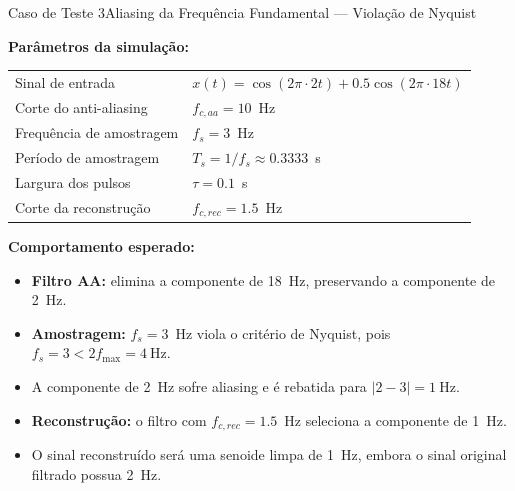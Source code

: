 \begin{frame}{Caso de Teste 3}{Aliasing da Frequência Fundamental — Violação de Nyquist}
	\small
	
	\textbf{Parâmetros da simulação:}
	
	\begin{center}
		\begin{tabular}{ll}
			\hline
			Sinal de entrada & $x(t)=\cos(2\pi\cdot2t)+0.5\cos(2\pi\cdot18t)$ \\
			Corte do anti-aliasing & $f_{c,aa}=10$~Hz \\
			Frequência de amostragem & $f_s=3$~Hz \\
			Período de amostragem & $T_s=1/f_s\approx0.3333$~s \\
			Largura dos pulsos & $\tau=0.1$~s \\
			Corte da reconstrução & $f_{c,rec}=1.5$~Hz \\
			\hline
		\end{tabular}
	\end{center}
	
	\vspace{0.5em}
	
	\textbf{Comportamento esperado:}
	
	\begin{itemize}
		\item \textbf{Filtro AA:} elimina a componente de 18~Hz, preservando a componente de 2~Hz.
		\item \textbf{Amostragem:} $f_s=3$~Hz viola o critério de Nyquist, pois
		$f_s=3 < 2f_{\max}=4~\text{Hz}$.
		\item A componente de 2~Hz sofre aliasing e é rebatida para $|2-3|=1~\text{Hz}$.
		\item \textbf{Reconstrução:} o filtro com $f_{c,rec}=1.5$~Hz seleciona a componente de 1~Hz.
		\item O sinal reconstruído será uma senoide limpa de 1~Hz, embora o sinal original filtrado possua 2~Hz.
	\end{itemize}
	
\end{frame}



